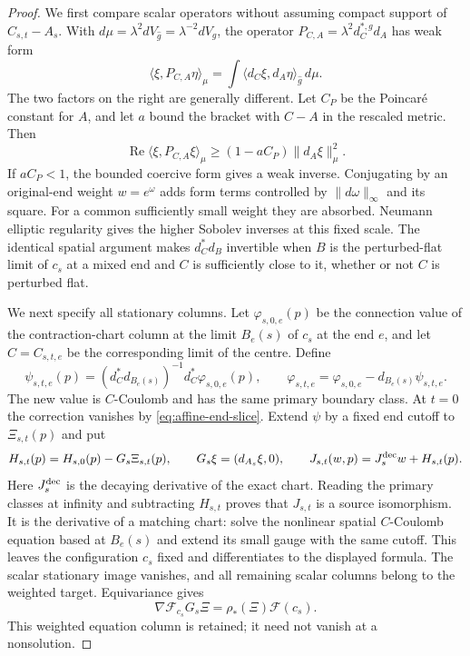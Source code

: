 \documentclass[11pt]{amsart}
\theoremstyle{definition}
\theoremstyle{remark}
\theoremstyle{plain}
\numberwithin{equation}{section}
\begin{document}
\begin{proof}
We first compare scalar operators without assuming compact
support of $C_{s,t}-A_s$. With
$d\mu=\lambda^2dV_{\widehat g}=\lambda^{-2}dV_g$, the operator
$P_{C,A}=\lambda^2d_C^{*,g}d_A$ has weak form
\begin{equation}\label{eq:affine-scalar-form}
 \langle\xi,P_{C,A}\eta\rangle_\mu
 =\int\langle d_C\xi,d_A\eta\rangle_{\widehat g}\,d\mu.
\end{equation}
The two factors on the right are generally different. Let $C_P$
be the Poincar\'e constant for $A$, and let $a$ bound the bracket
with $C-A$ in the rescaled metric. Then
\[
 \operatorname{Re}\langle\xi,P_{C,A}\xi\rangle_\mu
 \geq(1-aC_P)\|d_A\xi\|_\mu^2.
\]
If $aC_P<1$, the bounded coercive form gives a weak inverse.
Conjugating by an original-end weight $w=e^\omega$ adds form
terms controlled by $\|d\omega\|_\infty$ and its square. For a
common sufficiently small weight they are absorbed. Neumann
elliptic regularity gives the higher Sobolev inverses at this
fixed scale. The identical spatial argument makes $d_C^*d_B$
invertible when $B$ is the perturbed-flat limit of $c_s$ at a mixed end
and $C$ is sufficiently close to it, whether or not $C$ is perturbed
flat.

We next specify all stationary columns. Let $\varphi_{s,0,e}(p)$ be
the connection value of the contraction-chart column at the
limit $B_e(s)$ of $c_s$ at the end $e$, and let $C=C_{s,t,e}$ be the corresponding
limit of the centre. Define
\begin{equation}\label{eq:affine-columns}
 \psi_{s,t,e}(p)=(d_C^*d_{B_e(s)})^{-1}d_C^*\varphi_{s,0,e}(p),
 \qquad \varphi_{s,t,e}=\varphi_{s,0,e}-d_{B_e(s)}\psi_{s,t,e}.
\end{equation}
The new value is $C$-Coulomb and has the same primary boundary
class. At $t=0$ the correction vanishes by
\eqref{eq:affine-end-slice}. Extend $\psi$ by a fixed end cutoff
to $\Xi_{s,t}(p)$ and put
\[
 H_{s,t}(p)=H_{s,0}(p)-G_s\Xi_{s,t}(p),
 \qquad G_s\xi=(d_{A_s}\xi,0),\qquad
 J_{s,t}(w,p)=J_s^{\rm dec}w+H_{s,t}(p).
\]
Here $J_s^{\rm dec}$ is the decaying derivative of the exact
chart. Reading the primary classes at infinity and subtracting
$H_{s,t}$ proves that $J_{s,t}$ is a source isomorphism. It is
the derivative of a matching chart: solve the nonlinear
spatial $C$-Coulomb equation based at $B_e(s)$ and extend its
small gauge with the same cutoff. This leaves the configuration
$c_s$ fixed and differentiates to the displayed formula.
The scalar stationary image vanishes, and all remaining scalar
columns belong to the weighted target. Equivariance gives
\begin{equation}\label{eq:affine-residual-gauge}
 \nabla\mathcal F_{c_s}G_s\Xi
       =\rho_*(\Xi)\mathcal F(c_s).
\end{equation}
This weighted equation column is retained; it need not vanish
at a nonsolution.


\end{proof}
\end{document}
